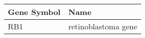 \begin{tabular}{ll}
\toprule
Gene Symbol &                Name \\
\midrule
        RB1 & retinoblastoma gene \\
\bottomrule
\end{tabular}
